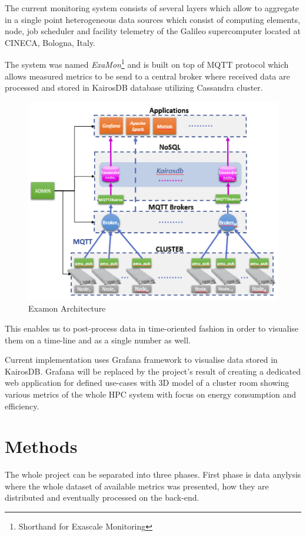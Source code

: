 \documentclass[a4paper, twoside]{article}
\newcommand{\highlight}[1]{\textcolor{prace-orange}{#1}}
\begin{document}
\begin{multicols}{3}

\lettrine[lines=4,nindent=0em]{\highlight{T}}{}he current monitoring system\cite{current} consists of several layers which allow to aggregate in a single point heterogeneous data sources which consist of computing elements, node, job scheduler and facility telemetry of the Galileo supercomputer located at CINECA, Bologna, Italy.

The system was named \textit{ExaMon}\footnote{Shorthand for Exascale Monitoring} and is built on top of MQTT protocol\cite{mqtt} which allows measured metrics to be send to a central broker where received data are processed and stored in KairosDB\cite{kairos} database utilizing Cassandra cluster.

\begin{figure}[H]
    \includegraphics[width=0.9\linewidth]{examon-architecture}
    \caption{Examon Architecture}
    \label{arch}
\end{figure}

This enables us to post-process data in time-oriented fashion in order to visualise them on a time-line and as a single number as well.

Current implementation uses Grafana framework to visualise data stored in KairosDB. Grafana will be replaced by the project's result of creating a dedicated web application for defined use-cases with 3D model of a cluster room showing various metrics of the whole HPC system with focus on energy consumption and efficiency.

\section*{Methods}
The whole project can be separated into three phases. First phase is data anylysis where the whole dataset of available metrics was presented, how they are distributed and eventually processed on the back-end.


\end{multicols}
\end{document}

